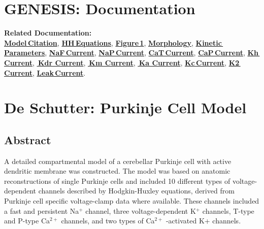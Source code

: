 \documentclass[12pt]{article}
\begin{document}
\section*{GENESIS: Documentation}

{\bf Related Documentation:}\\
\href{../pub-purkinje-deschutter1-citation/pub-purkinje-deschutter1-citation.tex}{\bf Model\,Citation}, 
\href{../pub-purkinje-deschutter1-equations1/pub-purkinje-deschutter1-equations1.tex}{\bf HH\,Equations},
\href{../pub-purkinje-deschutter1-fig-1/pub-purkinje-deschutter1-fig-1.tex}{\bf Figure\,1},
\href{../pub-purkinje-deschutter1-morphology/pub-purkinje-deschutter1-morphology.tex}{\bf Morphology},
\href{../pub-purkinje-deschutter1-table1/pub-purkinje-deschutter1-table1.tex}{\bf Kinetic\,Parameters},
\href{../pub-purkinje-deschutter1-conductance1-naf1/pub-purkinje-deschutter1-conductance1-naf1.tex}{\bf NaF\,Current},
\href{../pub-purkinje-deschutter1-conductance1-nap1/pub-purkinje-deschutter1-conductance1-nap1.tex}{\bf NaP\,Current},
\href{../pub-purkinje-deschutter1-conductance1-cat1/pub-purkinje-deschutter1-conductance1-cat1.tex}{\bf CaT\,Current},
\href{../pub-purkinje-deschutter1-conductance1-cap1/pub-purkinje-deschutter1-conductance1-cap1.tex}{\bf CaP\,Current},
\href{../pub-purkinje-deschutter1-conductance1-kh1/pub-purkinje-deschutter1-conductance1-kh1.tex}{\bf Kh\,Current},
\href{../pub-purkinje-deschutter1-conductance1-kdr1/pub-purkinje-deschutter1-conductance1-kdr1.tex}{\bf\,Kdr Current},
\href{../pub-purkinje-deschutter1-conductance1-km1/pub-purkinje-deschutter1-conductance1-km1.tex}{\bf\,Km Current},
\href{../pub-purkinje-deschutter1-conductance1-ka1/pub-purkinje-deschutter1-conductance1-ka1.tex}{\bf\,Ka Current},
\href{../pub-purkinje-deschutter1-conductance1-kc1/pub-purkinje-deschutter1-conductance1-kc1.tex}{\bf Kc\,Current},
\href{../pub-purkinje-deschutter1-conductance1-k2/pub-purkinje-deschutter1-conductance1-k2.tex}{\bf K2\,Current},
\href{../pub-purkinje-deschutter1-conductance1-leak1/pub-purkinje-deschutter1-conductance1-leak1.tex}{\bf Leak\,Current}.

\section*{De Schutter: Purkinje Cell Model}

\subsection*{Abstract}

A detailed compartmental model of a cerebellar Purkinje
cell with active dendritic membrane was constructed. The model
was based on anatomic reconstructions of single Purkinje cells and
included 10 different types of voltage-dependent channels described
by Hodgkin-Huxley equations, derived from Purkinje cell specific
voltage-clamp data where available. These channels included
a fast and persistent Na$^+$ channel, three voltage-dependent
K$^+$ channels, T-type and P-type Ca$^{2+}$ channels, and two types of
Ca$^{2+}$ -activated K+ channels.
\end{document}
